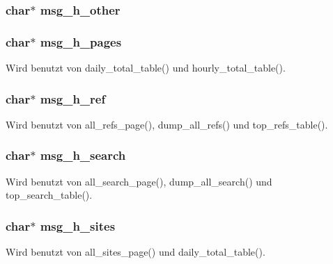 \subsubsection{\setlength{\rightskip}{0pt plus 5cm}char$\ast$ {\bf msg\_\-h\_\-other}}\label{lang_8h_b351e925c0e7fcdb3483ab94cba23c9c}


\subsubsection{\setlength{\rightskip}{0pt plus 5cm}char$\ast$ {\bf msg\_\-h\_\-pages}}\label{lang_8h_db4c9ee2d878d68d50a008b354042927}




Wird benutzt von daily\_\-total\_\-table() und hourly\_\-total\_\-table().
\subsubsection{\setlength{\rightskip}{0pt plus 5cm}char$\ast$ {\bf msg\_\-h\_\-ref}}\label{lang_8h_044f17c6b922b4c62fcd9d60dc5743b6}




Wird benutzt von all\_\-refs\_\-page(), dump\_\-all\_\-refs() und top\_\-refs\_\-table().
\subsubsection{\setlength{\rightskip}{0pt plus 5cm}char$\ast$ {\bf msg\_\-h\_\-search}}\label{lang_8h_a60f1bd74d1fb88de31964981fc8d0d6}




Wird benutzt von all\_\-search\_\-page(), dump\_\-all\_\-search() und top\_\-search\_\-table().
\subsubsection{\setlength{\rightskip}{0pt plus 5cm}char$\ast$ {\bf msg\_\-h\_\-sites}}\label{lang_8h_40421f6c86f03b581ec81e010c8d0086}




Wird benutzt von all\_\-sites\_\-page() und daily\_\-total\_\-table().
